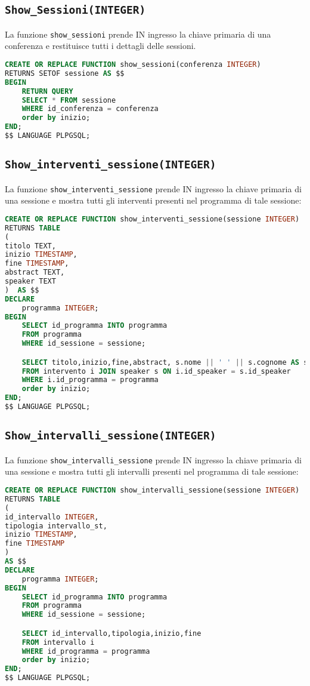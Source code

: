 \subsection{\texttt{Show\_Sessioni(INTEGER)}}
La funzione \texttt{show\_sessioni} prende IN ingresso la chiave primaria di una conferenza e restituisce tutti i dettagli delle sessioni.
\begin{lstlisting}[language=SQL, style=mystyle]
CREATE OR REPLACE FUNCTION show_sessioni(conferenza INTEGER)
RETURNS SETOF sessione AS $$
BEGIN
	RETURN QUERY
	SELECT * FROM sessione
	WHERE id_conferenza = conferenza
	order by inizio;
END;
$$ LANGUAGE PLPGSQL;
\end{lstlisting}
\subsection{\texttt{Show\_interventi\_sessione(INTEGER)}}
La funzione \texttt{show\_interventi\_sessione} prende IN ingresso la chiave primaria di una sessione e mostra tutti gli interventi presenti nel programma di tale sessione:
\begin{lstlisting}[language=SQL,style=mystyle]
CREATE OR REPLACE FUNCTION show_interventi_sessione(sessione INTEGER)
RETURNS TABLE
(
titolo TEXT,
inizio TIMESTAMP,
fine TIMESTAMP,
abstract TEXT,
speaker TEXT
)  AS $$
DECLARE 
	programma INTEGER;
BEGIN
	SELECT id_programma INTO programma
	FROM programma
	WHERE id_sessione = sessione;

	SELECT titolo,inizio,fine,abstract, s.nome || ' ' || s.cognome AS speaker
	FROM intervento i JOIN speaker s ON i.id_speaker = s.id_speaker
	WHERE i.id_programma = programma
	order by inizio;
END;
$$ LANGUAGE PLPGSQL;
\end{lstlisting}

\subsection{\texttt{Show\_intervalli\_sessione(INTEGER)}}
La funzione \texttt{show\_intervalli\_sessione} prende IN ingresso la chiave primaria di una sessione e mostra tutti gli intervalli presenti nel programma di tale sessione:
\begin{lstlisting}[language=SQL,style=mystyle]
CREATE OR REPLACE FUNCTION show_intervalli_sessione(sessione INTEGER)
RETURNS TABLE
(
id_intervallo INTEGER,
tipologia intervallo_st,
inizio TIMESTAMP,
fine TIMESTAMP
)  
AS $$
DECLARE 
	programma INTEGER;
BEGIN
	SELECT id_programma INTO programma
	FROM programma
	WHERE id_sessione = sessione;

	SELECT id_intervallo,tipologia,inizio,fine
	FROM intervallo i
	WHERE id_programma = programma
	order by inizio;
END;
$$ LANGUAGE PLPGSQL;
\end{lstlisting}
